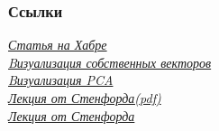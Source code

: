 \documentclass[14pt]{beamer}
\begin{document}
\begin{frame}
	\frametitle{Ссылки}
	\href{https://habrahabr.ru/post/304214/}{\textit{Статья на Хабре}}\\
	\href{http://setosa.io/ev/eigenvectors-and-eigenvalues/}{\textit{Bизуализация собственных векторов}}\\
	\href{http://setosa.io/ev/principal-component-analysis/}{\textit{Bизуализация PCA}}\\
	\href{https://www.youtube.com/watch?v=ey2PE5xi9-A}{\textit{Лекция от Стенфорда(pdf)}}\\
	\href{http://cs229.stanford.edu/notes/cs229-notes10.pdf}{\textit{Лекция от Стенфорда}}\\
\end{frame}
\end{document}
